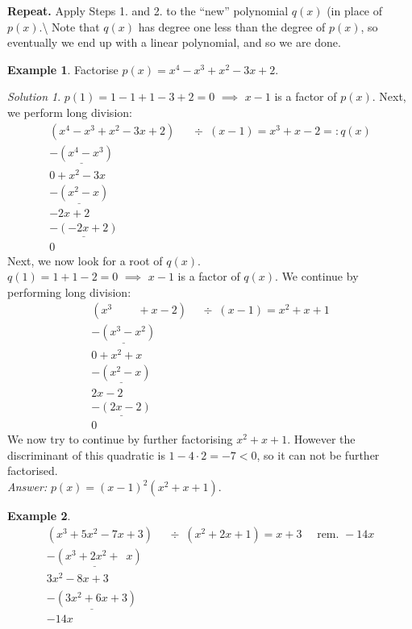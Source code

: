 \documentclass[
  12pt,
  oneside]{book}
\theoremstyle{definition}
\theoremstyle{definition}
\newtheorem{example}{Example}[chapter]
\theoremstyle{definition}
\theoremstyle{definition}
\theoremstyle{remark}
\newtheorem*{solution}{Solution}
\begin{document}
\textbf{Repeat.} Apply Steps 1. and 2. to the ``new'' polynomial \(q(x)\) (in place of \(p(x)\).\textbackslash{}
Note that \(q(x)\) has degree one less than the degree of \(p(x)\), so eventually
we end up with a linear polynomial, and so we are done.

\begin{example}
Factorise \(p(x)=x^4-x^3+x^2-3x+2\).
\end{example}

\begin{solution}
\(p(1)=1-1+1-3+2=0\) \(\implies\) \(x-1\) is a factor of \(p(x)\). Next, we perform long division:
\[
\begin{array}{rl}
(x^4-x^3+x^2-3x+2) & \div \,\,\,(x-1) = x^3+x-2 =: q(x)\\
\underline{-(x^4-x^3)}\phantom{+x^2-3x+2x}\\
0 + x^2-3x\phantom{+2m}\\
\underline{-(x^2-x)}\phantom{+2x}\\
-2x+2\phantom{x}\\
\underline{-(-2x+2)}\\
0\phantom{x}
\end{array}
\]
Next, we now look for a root of \(q(x)\).\\
\(q(1) = 1+1-2=0\) \(\implies\) \(x-1\) is a factor of \(q(x)\). We continue by performing long division:
\[
\begin{array}{rl}
(x^3\phantom{-xm}+x-2) & \div \,\,\,(x-1) = x^2+x+1\\
\underline{-(x^3-x^2)}\phantom{x+2xx}\\
0 + x^2+x\phantom{+2m}\\
\underline{-(x^2-x)}\phantom{+2x}\\
 2x-2\phantom{x}\\
\underline{-(2x-2)}\\
0\phantom{x}
\end{array}
\]
We now try to continue by further factorising \(x^2+x+1\). However the discriminant of this quadratic is \(1-4\cdot2=-7<0\), so it can not be further factorised.\\
\emph{Answer:} \(p(x)=(x-1)^2(x^2+x+1)\).
\end{solution}

\begin{example}
\[
\begin{array}{rl}
(x^3+5x^2-7x+3) &\div\,\,\,(x^2+2x+1) = x+3\quad\text{ rem. }-14x\\
\underline{-(x^3+2x^2+\phantom{7}x)}\phantom{+3)}\\
3x^2-8x+3\phantom{)}\\
\underline{-(3x^2+6x+3)}\\
-14x\phantom{+3m}
\end{array}
\]
\end{example}
\end{document}
